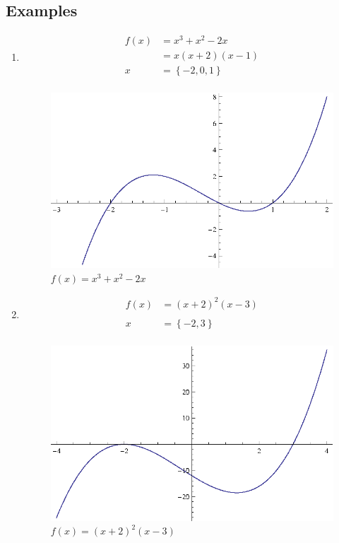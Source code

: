 \documentclass{article}
\begin{document}
\subsection{Examples}
\begin{enumerate}
  \item 
    \begin{align*}
      f(x) &= x^3 + x^2 - 2x \\
           &= x(x + 2)(x - 1)
      \\
      x    &= \left\{ -2, 0, 1 \right\} \\
    \end{align*}
    
    \begin{figure}[H]
      \centering
      \includegraphics[scale=0.9]{graph5.eps}
      \caption*{$f(x) = x^3 + x^2 - 2x$}
    \end{figure}

  \item 
    \begin{align*}
      f(x) &= (x + 2)^2(x - 3) \\
      \\
      x    &= \left\{ -2, 3 \right\} \\
    \end{align*}
    
    \begin{figure}[H]
      \centering
      \includegraphics[scale=0.9]{graph8.eps}
      \caption*{$f(x) = (x + 2)^2(x - 3)$}
    \end{figure}


\end{enumerate}
\end{document}
